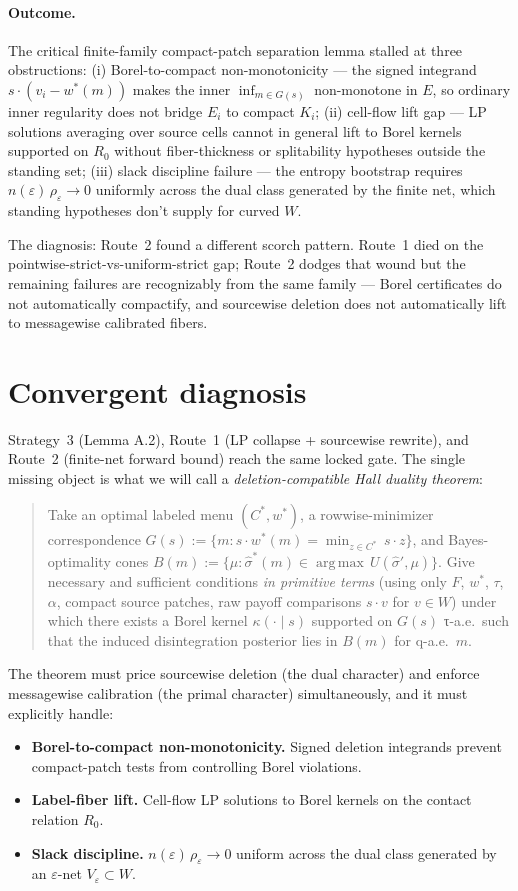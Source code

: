 \documentclass[11pt]{article}
\theoremstyle{definition}
\theoremstyle{remark}
\newcommand{\eps}{\varepsilon}
\newcommand{\argmax}{\operatorname*{arg\,max}}
\begin{document}
\paragraph{Outcome.} The critical finite-family compact-patch
separation lemma stalled at three obstructions: (i) Borel-to-compact
non-monotonicity --- the signed integrand $s\cdot(v_i - w^*(m))$
makes the inner $\inf_{m\in G(s)}$ non-monotone in $E$, so ordinary
inner regularity does not bridge $E_i$ to compact $K_i$; (ii)
cell-flow lift gap --- LP solutions averaging over source cells
cannot in general lift to Borel kernels supported on $R_0$ without
fiber-thickness or splitability hypotheses outside the standing set;
(iii) slack discipline failure --- the entropy bootstrap requires
$n(\eps)\,\rho_\eps \to 0$ uniformly across the dual class generated
by the finite net, which standing hypotheses don't supply for curved $W$.

The diagnosis: Route~2 found a different scorch pattern. Route~1
died on the pointwise-strict-vs-uniform-strict gap; Route~2 dodges
that wound but the remaining failures are recognizably from the same
family --- Borel certificates do not automatically compactify, and
sourcewise deletion does not automatically lift to messagewise
calibrated fibers.

\section{Convergent diagnosis}\label{sec:diagnosis}

Strategy~3 (Lemma A.2), Route~1 (LP collapse + sourcewise rewrite),
and Route~2 (finite-net forward bound) reach the same locked gate.
The single missing object is what we will call a
\emph{deletion-compatible Hall duality theorem}:
\begin{quote}
Take an optimal labeled menu $(C^*, w^*)$, a rowwise-minimizer
correspondence $G(s) := \{m : s\cdot w^*(m) = \min_{z\in C^*}\,s\cdot z\}$,
and Bayes-optimality cones $B(m) := \{\mu : \hat\sigma^*(m)\in\argmax\,U(\hat\sigma',\mu)\}$.
Give necessary and sufficient conditions \emph{in primitive terms}
(using only $F$, $w^*$, $\tau$, $\alpha$, compact source patches, raw
payoff comparisons $s\cdot v$ for $v\in W$) under which there exists
a Borel kernel $\kappa(\cdot\mid s)$ supported on $G(s)$ τ-a.e.\ such
that the induced disintegration posterior lies in $B(m)$ for q-a.e.~$m$.
\end{quote}
The theorem must price sourcewise deletion (the dual character) and
enforce messagewise calibration (the primal character)
simultaneously, and it must explicitly handle:
\begin{itemize}[leftmargin=2em]
\item \textbf{Borel-to-compact non-monotonicity.} Signed deletion
integrands prevent compact-patch tests from controlling Borel
violations.
\item \textbf{Label-fiber lift.} Cell-flow LP solutions to Borel
kernels on the contact relation $R_0$.
\item \textbf{Slack discipline.} $n(\eps)\,\rho_\eps \to 0$ uniform
across the dual class generated by an $\eps$-net $V_\eps \subset W$.
\end{itemize}
\end{document}

